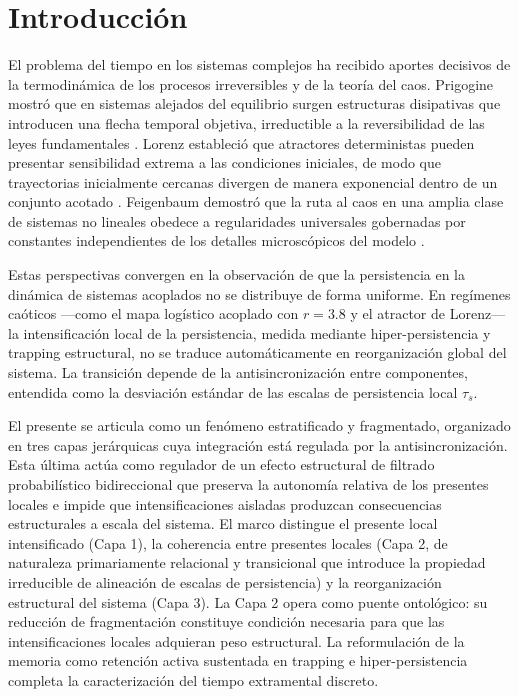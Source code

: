 \section{Introducción}

El problema del tiempo en los sistemas complejos ha recibido aportes decisivos de la termodinámica de los procesos irreversibles y de la teoría del caos. Prigogine mostró que en sistemas alejados del equilibrio surgen estructuras disipativas que introducen una flecha temporal objetiva, irreductible a la reversibilidad de las leyes fundamentales \citep{prigogine_being_to_becoming_1980,prigogine_stengers_order_out_chaos}. Lorenz estableció que atractores deterministas pueden presentar sensibilidad extrema a las condiciones iniciales, de modo que trayectorias inicialmente cercanas divergen de manera exponencial dentro de un conjunto acotado \citep{lorenz_deterministic_nonperiodic_1963}. Feigenbaum demostró que la ruta al caos en una amplia clase de sistemas no lineales obedece a regularidades universales gobernadas por constantes independientes de los detalles microscópicos del modelo \citep{feigenbaum_quantitative_universality_1978}.

Estas perspectivas convergen en la observación de que la persistencia en la dinámica de sistemas acoplados no se distribuye de forma uniforme. En regímenes caóticos —como el mapa logístico acoplado con $r=3.8$ y el atractor de Lorenz— la intensificación local de la persistencia, medida mediante hiper-persistencia y trapping estructural, no se traduce automáticamente en reorganización global del sistema. La transición depende de la antisincronización entre componentes, entendida como la desviación estándar de las escalas de persistencia local $\tau_s$.

El presente se articula como un fenómeno estratificado y fragmentado, organizado en tres capas jerárquicas cuya integración está regulada por la antisincronización. Esta última actúa como regulador de un efecto estructural de filtrado probabilístico bidireccional que preserva la autonomía relativa de los presentes locales e impide que intensificaciones aisladas produzcan consecuencias estructurales a escala del sistema. El marco distingue el presente local intensificado (Capa 1), la coherencia entre presentes locales (Capa 2, de naturaleza primariamente relacional y transicional que introduce la propiedad irreducible de alineación de escalas de persistencia) y la reorganización estructural del sistema (Capa 3). La Capa 2 opera como puente ontológico: su reducción de fragmentación constituye condición necesaria para que las intensificaciones locales adquieran peso estructural. La reformulación de la memoria como retención activa sustentada en trapping e hiper-persistencia completa la caracterización del tiempo extramental discreto.